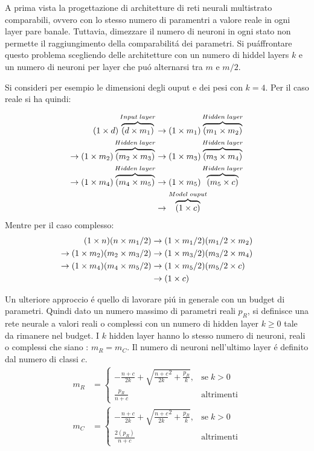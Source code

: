 \documentclass[a4paper,12pt]{report}
\begin{document}
 A prima vista la progettazione di architetture di reti neurali multistrato comparabili, ovvero con lo stesso numero di paramentri a valore reale in ogni layer pare banale. 
 Tuttavia, dimezzare il numero di neuroni in ogni stato non permette il raggiungimento della comparabilit\'a dei parametri. 
 Si pu\' affrontare questo problema scegliendo delle architetture con un numero di hiddel layers $k$ e un numero di neuroni per layer che pu\'o alternarsi tra $m$ e $m/2$. 
 
 Si consideri per esempio le dimensioni degli ouput e dei pesi con $k=4$. Per il caso reale si ha quindi:
 
\begin{align}
  (1 \times d)\overbrace{(d \times m_1)}^{Input \; layer} &\to (1 \times m_1)\overbrace{(m_1 \times m_2)}^{Hidden \; layer} \\
  \to (1 \times m_2)\overbrace{(m_2 \times m_3)}^{Hidden \; layer} &\to (1 \times m_3)\overbrace{(m_3 \times m_4)}^{Hidden \; layer} \notag \\
  \to (1 \times m_4)\overbrace{(m_4 \times m_5)}^{Hidden \; layer} &\to (1 \times m_5)\overbrace{(m_5 \times c)}^{Hidden \; layer} \notag \\
  &\to \overbrace{(1 \times c)}^{Model \; ouput} \notag
 \end{align}
Mentre per il caso complesso:
 \begin{align}
  (1 \times n)(n \times m_1/2) &\to (1 \times m_1/2)(m_1/2 \times m_2)\\
  \to (1 \times m_2)(m_2 \times m_3/2) &\to (1 \times m_3/2)(m_3/2 \times m_4) \notag \\
  \to (1 \times m_4)(m_4 \times m_5/2) &\to (1 \times m_5/2)(m_5/2 \times c) \notag \\
  &\to (1 \times c) \notag
 \end{align}
 
 Un ulteriore approccio \'e quello di lavorare pi\'u in generale con un budget di parametri. 
 Quindi dato un numero massimo di parametri reali $p_R$, si definisce una rete neurale a valori reali o complessi con un numero di hidden layer $k \ge 0$ tale da rimanere nel budget. 
 I $k$ hidden layer hanno lo stesso numero di neuroni, reali o complessi che siano : $m_R = m_C$. Il numero di neuroni nell'ultimo layer \'e definito dal numero di classi $c$.
 \begin{align}
  m_R &= \begin{cases}
          -\frac{n+c}{2k} + \sqrt{ \frac{n+c}{2k}^2 + \frac{p_R}{k}}, & \mbox{se} \; k>0\\
          \frac{p_R}{n+c} & \mbox{altrimenti}
         \end{cases} \label{LastLayerR}\\
  m_C &= \begin{cases}
          -\frac{n+c}{2k} + \sqrt{ \frac{n+c}{2k}^2 + \frac{p_R}{k}}, & \mbox{se} \; k>0\\
          \frac{2(p_R)}{n+c} & \mbox{altrimenti}
         \end{cases} \label{LastLayerC}
 \end{align}
\end{document}

